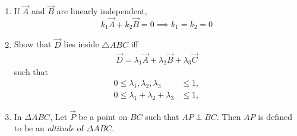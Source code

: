 \begin{enumerate}[label=\arabic*.,ref=\thesubsection.\theenumi]
%
\item If $\vec{A}$ and $\vec{B}$ are linearly independent,  
\begin{equation}
k_1\vec{A} + k_2\vec{B} = 0 \implies k_1=k_2=0
\end{equation}
\item Show that $\vec{D}$ lies inside $\triangle ABC$ iff
\begin{align}
\vec{D} = \lambda_1\vec{A} + \lambda_2\vec{B} + \lambda_3\vec{C}
\end{align}
such that
\begin{align}
0 \le \lambda_1, \lambda_2, \lambda_3 &\le 1,
\\
0 \le \lambda_1+\lambda_2+\lambda_3 &\le 1,
\end{align}
\item
In $\Delta ABC$,  Let $\vec{P}$ be a point on $BC$ such that $AP \perp BC$.  Then $AP$ is defined to be 
an {\em altitude} of $\Delta ABC$.


\end{enumerate}
